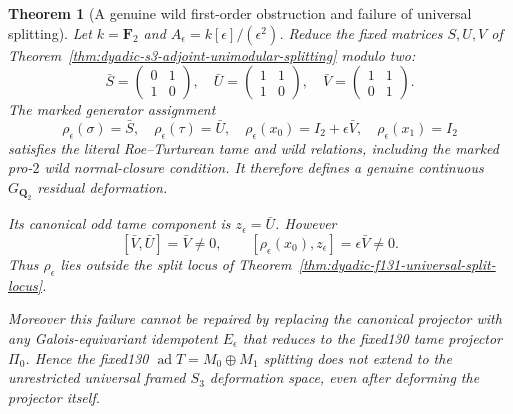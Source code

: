 \documentclass[11pt]{article}
\newtheorem{theorem}{Theorem}[section]
\theoremstyle{definition}
\begin{document}
\begin{theorem}[A genuine wild first-order obstruction and failure of universal splitting]
\label{thm:dyadic-f131-first-order-nosplit}
Let
$k=\mathbf F_2$ and
$A_\epsilon=k[\epsilon]/(\epsilon^2)$.
Reduce the fixed matrices
$S,U,V$ of
Theorem~\ref{thm:dyadic-s3-adjoint-unimodular-splitting}
modulo two:
\begin{equation}\label{eq:dyadic-f131-wild-counterexample-matrices}
\bar S=
\begin{pmatrix}0&1\\1&0\end{pmatrix},
\quad
\bar U=
\begin{pmatrix}1&1\\1&0\end{pmatrix},
\quad
\bar V=
\begin{pmatrix}1&1\\0&1\end{pmatrix}.
\end{equation}
The marked generator assignment
\begin{equation}\label{eq:dyadic-f131-wild-counterexample-rep}
\boxed{\quad
\rho_\epsilon(\sigma)=\bar S,\quad
\rho_\epsilon(\tau)=\bar U,\quad
\rho_\epsilon(x_0)=I_2+\epsilon\bar V,\quad
\rho_\epsilon(x_1)=I_2
\quad}
\end{equation}
satisfies the literal
Roe--Turturean tame and
wild relations, including
the marked pro-$2$ wild
normal-closure condition.
It therefore defines a
genuine continuous
$G_{\mathbf Q_2}$ residual
deformation.

Its canonical odd tame
component is
$z_\epsilon=\bar U$.
However
\begin{equation}\label{eq:dyadic-f131-nonzero-wild-commutator}
\boxed{\quad
[\bar V,\bar U]=\bar V\ne0,\qquad
[\rho_\epsilon(x_0),z_\epsilon]
=\epsilon\bar V\ne0.
\quad}
\end{equation}
Thus $\rho_\epsilon$ lies
outside the split locus of
Theorem~\ref{thm:dyadic-f131-universal-split-locus}.

Moreover this failure
cannot be repaired by
replacing the canonical
projector with \emph{any}
Galois-equivariant
idempotent
$E_\epsilon$ that reduces
to the fixed130 tame
projector $\Pi_0$.
Hence the fixed130
$\operatorname{ad}T=M_0\oplus M_1$
splitting does \emph{not}
extend to the unrestricted
universal framed
$S_3$ deformation space,
even after deforming the
projector itself.
\end{theorem}
\end{document}
